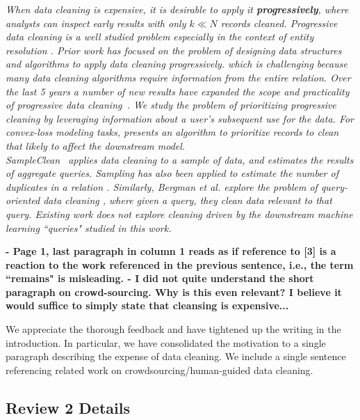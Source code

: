 \emph{When data cleaning is expensive, it is desirable to apply it \textbf{progressively}, where analysts can inspect early results with only $k \ll N$ records cleaned.
Progressive data cleaning is a well studied problem especially in the context of entity resolution \cite{altowim2014progressive, whang2014incremental, papenbrock2015progressive, gruenheid2014incremental}.
Prior work has focused on the problem of designing data structures and algorithms to apply data cleaning progressively. which is challenging because many data cleaning algorithms require information from the entire relation.
Over the last 5 years a number of new results have expanded the scope and practicality of progressive data cleaning~\cite{mayfield2010eracer, DBLP:journals/pvldb/YakoutENOI11, yakout2013don}.
We study the problem of prioritizing progressive cleaning by leveraging information about a user's subsequent use for the data.
For convex-loss modeling tasks, \sys presents an algorithm to prioritize records to clean that likely to affect the downstream model.\\
SampleClean~\cite{wang1999sample} applies data cleaning to a sample of data, and estimates the results of aggregate queries.
Sampling has also been applied to estimate the number of duplicates in a relation \cite{heise2014estimating}. 
Similarly, Bergman et al. explore the problem of query-oriented data cleaning \cite{DBLP:conf/sigmod/BergmanMNT15}, where given a query, they clean data relevant to that query. 
Existing work does not explore cleaning driven by the downstream machine learning ``queries" studied in this work.}

\vspace{0.5em}

\noindent\textbf{- Page 1, last paragraph in column 1 reads as if reference to [3] is a reaction to the work referenced in the previous sentence, i.e., the term ``remains" is misleading.
- I did not quite understand the short paragraph on crowd-sourcing. Why is this even relevant?
 I believe it would suffice to simply state that cleansing is expensive...}

We appreciate the thorough feedback and have tightened up the writing in the introduction. In particular, we have consolidated the motivation to a single paragraph describing the expense of data cleaning. We include a single sentence referencing related work on crowdsourcing/human-guided data cleaning.


\subsection*{Review 2 Details}

